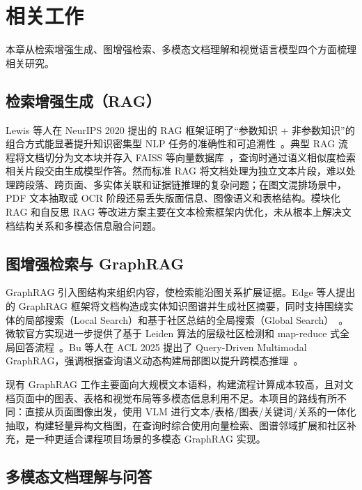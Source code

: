 
\chapter{相关工作}\label{ch:related}

本章从检索增强生成、图增强检索、多模态文档理解和视觉语言模型四个方面梳理相关研究。

\section{检索增强生成（RAG）}

Lewis 等人在 NeurIPS 2020 提出的 RAG 框架证明了``参数知识 + 非参数知识''的组合方式能显著提升知识密集型 NLP 任务的准确性和可追溯性~\cite{lewis2020rag}。典型 RAG 流程将文档切分为文本块并存入 FAISS 等向量数据库~\cite{johnson2019faiss}，查询时通过语义相似度检索相关片段交由生成模型作答。然而标准 RAG 将文档处理为独立文本片段，难以处理跨段落、跨页面、多实体关联和证据链推理的复杂问题；在图文混排场景中，PDF 文本抽取或 OCR 阶段还易丢失版面信息、图像语义和表格结构。模块化 RAG 和自反思 RAG 等改进方案主要在文本检索框架内优化，未从根本上解决文档结构关系和多模态信息融合问题。

\section{图增强检索与 GraphRAG}

GraphRAG 引入图结构来组织内容，使检索能沿图关系扩展证据。Edge 等人提出的 GraphRAG 框架将文档构造成实体知识图谱并生成社区摘要，同时支持围绕实体的局部搜索（Local Search）和基于社区总结的全局搜索（Global Search）~\cite{edge2024graphrag}。微软官方实现进一步提供了基于 Leiden 算法的层级社区检测和 map-reduce 式全局回答流程~\cite{microsoft2025graphrag}。Bu 等人在 ACL 2025 提出了 Query-Driven Multimodal GraphRAG，强调根据查询语义动态构建局部图以提升跨模态推理~\cite{bu2025query}。

现有 GraphRAG 工作主要面向大规模文本语料，构建流程计算成本较高，且对文档页面中的图表、表格和视觉布局等多模态信息利用不足。本项目的路线有所不同：直接从页面图像出发，使用 VLM 进行文本/表格/图表/关键词/关系的一体化抽取，构建轻量异构文档图，在查询时综合使用向量检索、图谱邻域扩展和社区补充，是一种更适合课程项目场景的多模态 GraphRAG 实现。

\section{多模态文档理解与问答}

